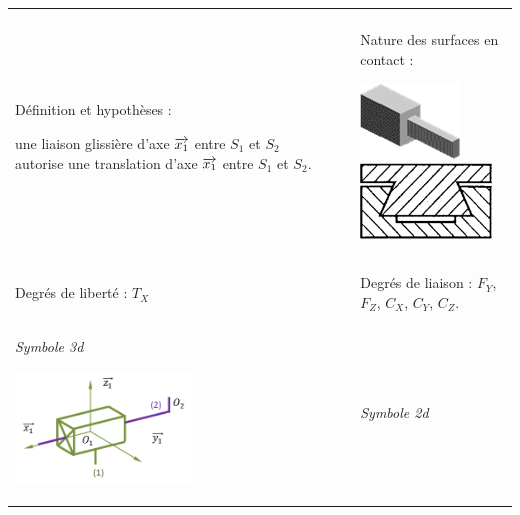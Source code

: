 \documentclass[10pt,oneside]{article}
\begin{document}
\begin{center}
\begin{tabular}{p{} c p{}}
\hline
& &\\
Définition et hypothèses : 

une liaison glissière d'axe $\overrightarrow{x_1}$ entre $S_1$ et $S_2$ autorise une translation d'axe $\overrightarrow{x_1}$ entre $S_1$ et $S_2$. 
&& Nature des surfaces en contact :
\begin{center}
\includegraphics[height=2cm]{png/glissiere_S1}
\hspace{.5cm}
\includegraphics[height=2cm]{png/glissiere_S2}
\end{center}
\\
&& \\
\hline
&& \\
Degrés de liberté : $T_X$
&& Degrés de liaison : $F_Y$, $F_Z$, $C_X$, $C_Y$, $C_Z$. \\
&& \\
\hline
\begin{center}
\textit{Symbole 3d}

\includegraphics[height=3cm]{png/glissiere_3d} 
\end{center}

&&
\begin{center}
\textit{Symbole 2d}


\end{center}
\end{tabular}
\end{center}
\end{document}
